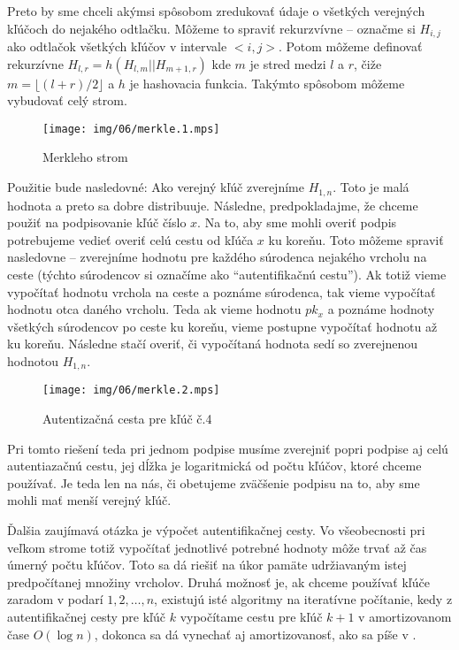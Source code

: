 Preto by sme chceli akýmsi spôsobom zredukovať údaje o všetkých
verejných kľúčoch do nejakého odtlačku. Môžeme to spraviť rekurzvívne
-- označme si $H_{i,j}$ ako odtlačok všetkých kľúčov v intervale $<i,j>$.
Potom môžeme definovať rekurzívne $H_{l,r}=h(H_{l,m} || H_{m+1,r})$ kde
$m$ je stred medzi $l$ a $r$, čiže $m=\lfloor (l+r)/2 \rfloor$ a
$h$ je hashovacia funkcia. Takýmto spôsobom môžeme vybudovať celý
strom.
\begin{figure}[h]
    \centering
    \texttt{[image: img/06/merkle.1.mps]}
    \caption{Merkleho strom}
    \label{fig:merkle}
\end{figure}

Použitie bude nasledovné: Ako verejný kľúč zverejníme $H_{1,n}$. Toto je
malá hodnota a preto sa dobre distribuuje. Následne, predpokladajme, že
chceme použiť na podpisovanie kľúč číslo $x$. Na to, aby sme mohli overiť
podpis potrebujeme vedieť overiť celú cestu od kľúča $x$ ku koreňu. Toto
môžeme spraviť nasledovne -- zverejníme hodnotu pre každého súrodenca
nejakého vrcholu na ceste (týchto súrodencov si označíme ako
``autentifikačnú cestu'').
Ak totiž vieme vypočítať hodnotu vrchola na ceste a poznáme
súrodenca, tak vieme vypočítať hodnotu otca daného vrcholu.
Teda ak vieme hodnotu $pk_x$ a poznáme hodnoty všetkých súrodencov po ceste ku
koreňu, vieme postupne vypočítať hodnotu až ku koreňu. Následne stačí
overiť, či vypočítaná hodnota sedí so zverejnenou hodnotou $H_{1,n}$.

\begin{figure}[h]
    \centering
    \texttt{[image: img/06/merkle.2.mps]}
    \caption{Autentizačná cesta pre kľúč č.4}
    \label{fig:merkle}
\end{figure}

Pri tomto riešení teda pri jednom podpise musíme zverejniť popri podpise aj
celú autentiazačnú cestu, jej dĺžka je logaritmická od počtu kľúčov, ktoré
chceme používať. Je teda len na nás, či obetujeme zväčšenie podpisu na to,
aby sme mohli mať menší verejný kľúč.

Ďalšia zaujímavá otázka je výpočet autentifikačnej cesty. Vo všeobecnosti
pri veľkom strome totiž vypočítať jednotlivé potrebné hodnoty môže trvať až
čas úmerný počtu kľúčov. Toto sa dá riešiť na úkor pamäte udržiavaným istej
predpočítanej množiny vrcholov. Druhá možnosť je, ak chceme používať kľúče
zaradom v podarí $1,2,\dots,n$, existujú isté algoritmy na iteratívne
počítanie, kedy z autentifikačnej cesty pre kľúč $k$ vypočítame cestu pre
kľúč $k+1$ v amortizovanom čase $O(\log n)$, dokonca sa dá vynechať aj
amortizovanosť, ako sa píše v \cite{merkle_iter}.

